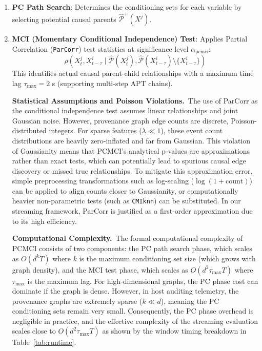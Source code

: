 \begin{enumerate}
\item \textbf{PC Path Search}: Determines the conditioning sets for each variable by selecting potential causal parents $\widehat{\mathcal{P}}^+(X^j)$.
\item \textbf{MCI (Momentary Conditional Independence) Test}: Applies Partial Correlation (\texttt{ParCorr}) test statistics at significance level $\alpha_{\text{pcmci}}$:
\begin{equation}
\rho(X_t^j, X_{t-\tau}^i \mid \widehat{\mathcal{P}}(X_t^j), \widehat{\mathcal{P}}(X_{t-\tau}^i) \setminus \{X_{t-\tau}^i\})
\end{equation}
This identifies actual causal parent-child relationships with a maximum time lag $\tau_{\max} = 2$ s (supporting multi-step APT chains). 

\textbf{Statistical Assumptions and Poisson Violations.}~The use of ParCorr as the conditional independence test assumes linear relationships and joint Gaussian noise. However, provenance graph edge counts are discrete, Poisson-distributed integers. For sparse features ($\lambda \ll 1$), these event count distributions are heavily zero-inflated and far from Gaussian. This violation of Gaussianity means that PCMCI's analytical p-values are approximations rather than exact tests, which can potentially lead to spurious causal edge discovery or missed true relationships. To mitigate this approximation error, simple preprocessing transformations such as log-scaling ($\log(1 + \text{count})$) can be applied to align counts closer to Gaussianity, or computationally heavier non-parametric tests (such as \texttt{CMIknn}) can be substituted. In our streaming framework, ParCorr is justified as a first-order approximation due to its high efficiency.

\textbf{Computational Complexity.}~The formal computational complexity of PCMCI consists of two components: the PC path search phase, which scales as $O(d^k T)$ where $k$ is the maximum conditioning set size (which grows with graph density), and the MCI test phase, which scales as $O(d^2 \tau_{\max} T)$ where $\tau_{\max}$ is the maximum lag. For high-dimensional graphs, the PC phase cost can dominate if the graph is dense. However, in host auditing telemetry, the provenance graphs are extremely sparse ($k \ll d$), meaning the PC conditioning sets remain very small. Consequently, the PC phase overhead is negligible in practice, and the effective complexity of the streaming evaluation scales close to $O(d^2 \tau_{\max} T)$ as shown by the window timing breakdown in Table~\ref{tab:runtime}.
\end{enumerate}

